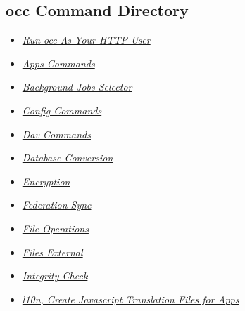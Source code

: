 \documentclass[letterpaper,10pt,english]{sphinxmanual}
\begin{document}
\subsection{occ Command Directory}
\label{configuration_server/occ_command:occ-command-directory}\begin{itemize}
\item {} 
{\hyperref[configuration_server/occ_command:http\string-user\string-label]{\emph{Run occ As Your HTTP User}}}

\item {} 
{\hyperref[configuration_server/occ_command:apps\string-commands\string-label]{\emph{Apps Commands}}}

\item {} 
{\hyperref[configuration_server/occ_command:background\string-jobs\string-selector\string-label]{\emph{Background Jobs Selector}}}

\item {} 
{\hyperref[configuration_server/occ_command:config\string-commands\string-label]{\emph{Config Commands}}}

\item {} 
{\hyperref[configuration_server/occ_command:dav\string-label]{\emph{Dav Commands}}}

\item {} 
{\hyperref[configuration_server/occ_command:database\string-conversion\string-label]{\emph{Database Conversion}}}

\item {} 
{\hyperref[configuration_server/occ_command:encryption\string-label]{\emph{Encryption}}}

\item {} 
{\hyperref[configuration_server/occ_command:federation\string-sync\string-label]{\emph{Federation Sync}}}

\item {} 
{\hyperref[configuration_server/occ_command:file\string-operations\string-label]{\emph{File Operations}}}

\item {} 
{\hyperref[configuration_server/occ_command:files\string-external\string-label]{\emph{Files External}}}

\item {} 
{\hyperref[configuration_server/occ_command:integrity\string-check\string-label]{\emph{Integrity Check}}}

\item {} 
{\hyperref[configuration_server/occ_command:create\string-javascript\string-translation\string-files\string-label]{\emph{l10n, Create Javascript Translation Files for Apps}}}


\end{itemize}
\end{document}
